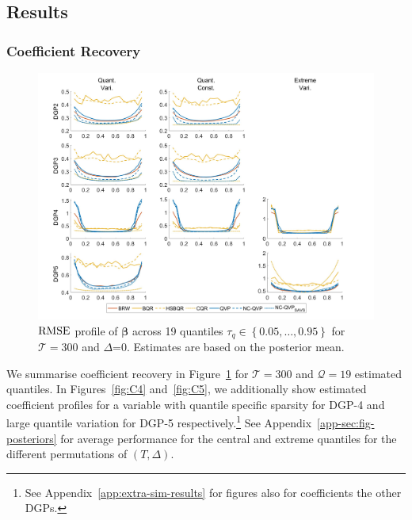 \subsection{Results}
\subsubsection{Coefficient Recovery}
%
\begin{figure}
    \centering
    \includegraphics[width=\linewidth]{Figures/CoeffBiasSpecificv3.jpg}
    \caption{$\operatorname{RMSE}$ profile of $\boldsymbol{\beta}$ across 19 quantiles $\tau_q \in \left\{0.05,\dotsc,0.95\right\}$ for $\mathcal{T}=300$ and $\varDelta$=0. Estimates are based on the posterior mean. }
    \label{fig:SpecCoeffBias}
\end{figure}
%
We summarise coefficient recovery in Figure~\ref{fig:SpecCoeffBias} for $\mathcal{T}=300$ and $\mathcal{Q}=19$ estimated quantiles. In Figures~\ref{fig:C4} and~\ref{fig:C5}, we additionally show estimated coefficient profiles for a variable with quantile specific sparsity for $\mathrm{DGP}$-4 and large quantile variation for $\mathrm{DGP}$-5 respectively.\footnote{See  Appendix~\ref{app:extra-sim-results} for figures also for coefficients the other DGPs.} See Appendix~\ref{app-sec:fig-posteriors} for average performance for the central and extreme quantiles for the different permutations of $(T,\varDelta)$. 
%


